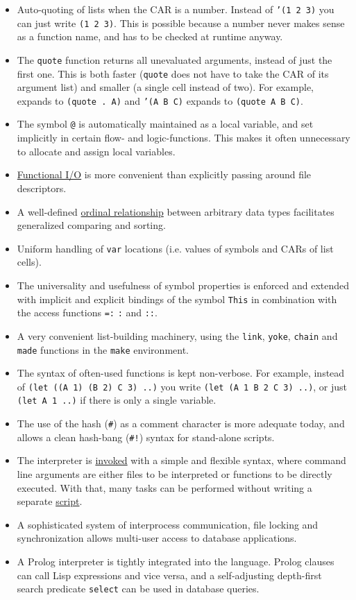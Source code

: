 \begin{itemize}
\item Auto-quoting of lists when the CAR is a number. Instead of \texttt{'(1 2 3)}    you can just write \texttt{(1 2 3)}. This is possible because a number never
   makes sense as a function name, and has to be checked at runtime
   anyway.
\item The \texttt{quote} function returns all unevaluated arguments, instead of
   just the first one. This is both faster (\texttt{quote} does not have to
   take the CAR of its argument list) and smaller (a single cell instead
   of two). For example,  expands to \texttt{(quote . A)} and \texttt{'(A B C)}    expands to \texttt{(quote A B C)}.
\item The symbol \texttt{@} is automatically maintained as a local variable, and
   set implicitly in certain flow- and logic-functions. This makes it
   often unnecessary to allocate and assign local variables.
\item \hyperref[tut.html-funio]{Functional I/O} is more convenient than explicitly
   passing around file descriptors.
\item A well-defined \hyperref[ref.html-cmp]{ordinal relationship} between
   arbitrary data types facilitates generalized comparing and sorting.
\item Uniform handling of \texttt{var} locations (i.e. values of symbols and CARs
   of list cells).
\item The universality and usefulness of symbol properties is enforced and
   extended with implicit and explicit bindings of the symbol \texttt{This} in
   combination with the access functions \texttt{=:}  \texttt{:} and \texttt{::}.
\item A very convenient list-building machinery, using the \texttt{link}, \texttt{yoke},
   \texttt{chain} and \texttt{made} functions in the \texttt{make} environment.
\item The syntax of often-used functions is kept non-verbose. For example,
   instead of \texttt{(let ((A 1) (B 2) C 3) ..)} you write
   \texttt{(let (A 1 B 2 C 3) ..)}, or just \texttt{(let A 1 ..)} if there is only a
   single variable.
\item The use of the hash (\texttt{\#}) as a comment character is more adequate
   today, and allows a clean hash-bang (\texttt{\#!}) syntax for stand-alone
   scripts.
\item The interpreter is \hyperref[ref.html-invoc]{invoked} with a simple and
   flexible syntax, where command line arguments are either files to be
   interpreted or functions to be directly executed. With that, many
   tasks can be performed without writing a separate
   \hyperref[tut.html-script]{script}.
\item A sophisticated system of interprocess communication, file locking
   and synchronization allows multi-user access to database
   applications.
\item A Prolog interpreter is tightly integrated into the language. Prolog
   clauses can call Lisp expressions and vice versa, and a
   self-adjusting depth-first search predicate \texttt{select} can be used in
   database queries.
\end{itemize}

